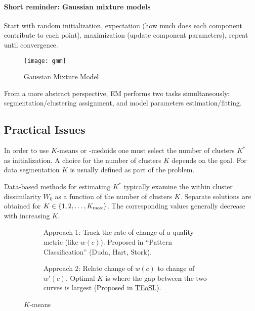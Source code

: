 \paragraph{Short reminder: Gaussian mixture models}

Start with random initialization, expectation (how much does each component contribute to each point), maximization (update component parameters), repeat until convergence.

\begin{figure}[H]
  \begin{minipage}[c]{0.55\textwidth}
    
  \end{minipage}
  \hfill
  \begin{minipage}[c]{0.45\textwidth}
    \texttt{[image: gmm]}
  \end{minipage}
  \caption{Gaussian Mixture Model}
\end{figure}

From a more abstract perspective, EM performs two tasks simultaneously: segmentation/clustering assignment, and model parameters estimation/fitting.

 \subsection{Practical Issues}
 In order to use \(K\)-means or -medoids one must select the number of clusters \(K^*\) as initialization. A choice for the number of clusters \(K\) depends on the goal. For data segmentation \(K\) is usually defined as part of the problem.

 Data-based methods for estimating \(K^*\) typically examine the within cluster dissimilarity \(W_k\) as a function of the number of clusters \(K\). Separate solutions are obtained for \(K \in \{1,2,\dots,K_{\mathrm{max}}\}\). The corresponding values generally decrease with increasing \(K\).

\begin{figure}[H]
 	\centering
 	\begin{subfigure}[t]{0.475\textwidth}
 	  \centering
 	  
   \caption{Approach 1: Track the rate of change of a quality metric (like $w(c)$). Proposed in ``Pattern Classification'' (Duda, Hart, Stork).}
 	\end{subfigure}
 	\hfill
 	\begin{subfigure}[t]{0.475\textwidth}
   	\centering
   	
   \caption{Approach 2: Relate change of $w(c)$ to change of $w'(c)$. Optimal \(K\) is where the gap between the two curves is largest (Proposed in \href{https://web.stanford.edu/~hastie/ElemStatLearn/}{TEoSL}).}
 	\end{subfigure}
 	\caption{$K$-means}
\end{figure}

